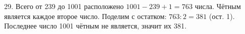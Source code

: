 29. Всего от 239 до 1001 расположено $1001-239+1=763$ числа. Чётным является каждое второе число. Поделим с остатком: $763:2=381$ (ост. 1). Последнее число 1001 чётным не является, значит их 381.\\

